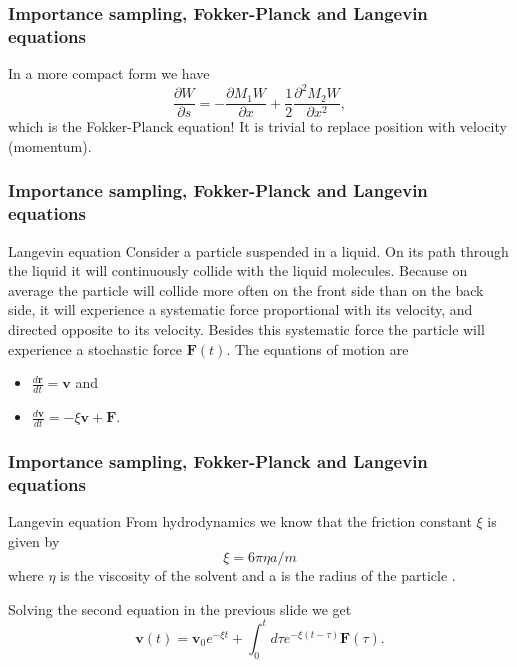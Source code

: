 \documentclass{beamer}
\begin{document}
\begin{frame}
\frametitle{Importance sampling, Fokker-Planck and Langevin equations}

\begin{block}{}
In a more compact form we have
\[
\frac{\partial W}{\partial s}=
-\frac{\partial M_1W}{\partial x}+
\frac{1}{2}\frac{\partial^2 M_2W}{\partial x^2},
\]
which is the Fokker-Planck equation!  It is trivial to replace 
position with velocity (momentum).
\end{block}
\end{frame}

\begin{frame}
\frametitle{Importance sampling, Fokker-Planck and Langevin equations}

\begin{block}{Langevin equation }
Consider a particle  suspended in a liquid. On its path through the liquid it will continuously collide with the liquid molecules. Because on average the particle  will collide more often on the front side than on the back side, it will experience a systematic force proportional with its velocity, and directed opposite to its velocity. Besides this systematic force the particle  will experience a stochastic force  $\mathbf{F}(t)$. 
The equations of motion are 
\begin{itemize}
\item $\frac{d\mathbf{r}}{dt}=\mathbf{v}$ and 

\item $\frac{d\mathbf{v}}{dt}=-\xi \mathbf{v}+\mathbf{F}$.
\end{itemize}

\noindent
\end{block}
\end{frame}

\begin{frame}
\frametitle{Importance sampling, Fokker-Planck and Langevin equations}

\begin{block}{Langevin equation }
From hydrodynamics  we know that the friction constant  $\xi$ is given by
\[
\xi =6\pi \eta a/m 
\]
where $\eta$ is the viscosity  of the solvent and a is the radius of the particle .

Solving the second equation in the previous slide we get 
\[
\mathbf{v}(t)=\mathbf{v}_{0}e^{-\xi t}+\int_{0}^{t}d\tau e^{-\xi (t-\tau )}\mathbf{F }(\tau ). 
\]
\end{block}
\end{frame}
\end{document}
